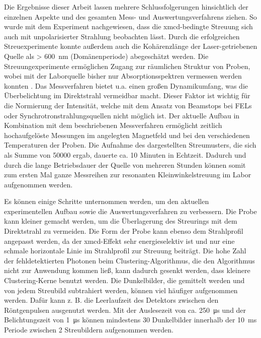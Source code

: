 \noindent
Die Ergebnisse dieser Arbeit lassen mehrere Schlussfolgerungen hinsichtlich der einzelnen Aspekte und des gesamten Mess- und Auswertungsverfahrens ziehen. So wurde mit dem Experiment nachgewiesen, dass die \gls{xmcd}-bedingte Streuung sich auch mit unpolarisierter Strahlung beobachten lässt. Durch die erfolgreichen Streuexperimente konnte außerdem auch die Kohärenzlänge der Laser-getriebenen Quelle als > \SI{600}{\nano\meter} (Domänenperiode) abegeschätzt werden. Die Streuungexperimente ermöglichen Zugang zur räumlichen Struktur von Proben, wobei mit der Laborquelle bisher nur Absorptionsspektren vermessen werden konnten \cite{schick_laser-driven_2021}. Das Messverfahren bietet u.a. einen großen Dynamikumfang, was die Überbelichtung im Direktstrahl vermeidbar macht. Dieser Faktor ist wichtig für die Normierung der Intensität, welche mit dem Ansatz von Beamstops bei FELs oder Synchrotronstrahlungsquellen nicht möglich ist. Der aktuelle Aufbau in Kombination mit dem beschriebenen Messverfahren ermöglicht zeitlich hochaufgelöste Messungen im angelegten Magnetfeld und bei den verschiedenen Temperaturen der Proben. Die Aufnahme des dargestellten Streumusters, die sich als Summe von \SI{50000}{\captures} ergab, dauerte ca. 10 Minuten in Echtzeit. Dadurch und durch die lange Betriebsdauer der Quelle von mehreren Stunden können somit zum ersten Mal ganze Messreihen zur resonanten Kleinwinkelstreuung im Labor aufgenommen werden.

\noindent
Es können einige Schritte unternommen werden, um den aktuellen experimentellen Aufbau sowie die Auswertungsverfahren zu verbessern. Die Probe kann kleiner gemacht werden, um die Überlagerung des Streurings mit dem Direktstrahl zu vermeiden. Die Form der Probe kann ebenso dem Strahlprofil angepasst werden, da der \gls{xmcd}-Effekt sehr energieselektiv ist und nur eine schmale horizontale Linie im Strahlprofil zur Streuung beiträgt. Die hohe Zahl der fehldetektierten Photonen beim Clustering-Algorithmus, die den Algorithmus nicht zur Anwendung kommen ließ, kann dadurch gesenkt werden, dass kleinere Clustering-Kerne benutzt werden. Die Dunkelbilder, die gemittelt werden und von jedem Streubild subtrahiert werden, können viel häufiger aufgenommen werden. Dafür kann z. B. die Leerlaufzeit des Detektors zwischen den Röntgenpulsen ausgenutzt werden. Mit der Auslesezeit von ca. \SI{250}{\micro\second} und der Belichtungszeit von \SI{1}{\micro\second} können mindestens 30 Dunkelbilder innerhalb der \SI{10}{\milli\second} Periode zwischen 2 Streubildern aufgenommen werden.

